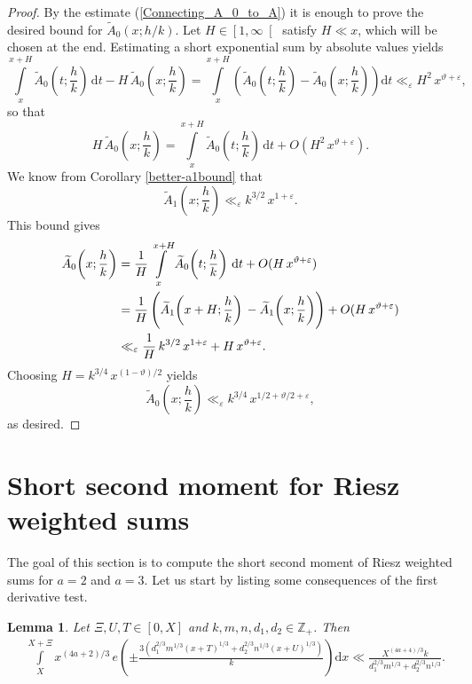 \documentclass[a4paper,10pt,twoside]{amsart}
\newtheorem{lemma}[theorem]{Lemma}
\theoremstyle{definition}
\numberwithin{equation}{section}
\newcommand\eps{\varepsilon}
\renewcommand\:{\colon}
\begin{document}
\begin{proof}
By the estimate (\ref{Connecting_A_0_to_A}) it is enough to prove the desired bound for $\widetilde A_0(x;h/k)$. Let $H\in\left[1,\infty\right[$ satisfy $H\ll x$, which will be chosen at the end. Estimating a short exponential sum by absolute values yields
\[\int\limits_x^{x+H}\widetilde A_0\!\left(t;\frac hk\right)\,\mathrm dt-H\,\widetilde A_0\!\left(x;\frac hk\right)=\int\limits_x^{x+H}\left(\widetilde A_0\!\left(t;\frac hk\right)-\widetilde A_0\!\left(x;\frac hk\right)\right)\mathrm dt\ll_\varepsilon H^2\,x^{\vartheta+\varepsilon},\]
so that
\[H\,\widetilde A_0\!\left(x;\frac hk\right)=\int\limits_x^{x+H}\widetilde A_0\!\left(t;\frac hk\right)\,\mathrm dt+O(H^2\,x^{\vartheta+\varepsilon}).\]
We know from Corollary \ref{better-a1bound} that
\[\widetilde A_1\!\left(x;\frac hk\right)\ll_\eps k^{3/2}\,x^{1+\varepsilon}.\]
This bound gives
\begin{align*}
\widetilde A_0\!\left(x;\frac hk\right)
&=\frac1{H}\int\limits_{x}^{x+H}\widetilde A_0\!\left(t;\frac hk\right)\,\mathrm dt+O(H\,x^{\vartheta+\varepsilon})\\
&=\frac1{H}\left(\widetilde A_1\!\left(x+H;\frac hk\right)\vphantom{\Bigg|}-\widetilde A_1\!\left(x;\frac hk\right)\right)+O(H\,x^{\vartheta+\varepsilon})\\
&\ll_\eps\frac1H\,k^{3/2}\,x^{1+\varepsilon}+H\,x^{\vartheta+\varepsilon}.
\end{align*}
Choosing $H=k^{3/4}\,x^{(1-\vartheta)/2}$ yields
\[\widetilde A_0\!\left(x;\frac hk\right)\ll_\eps k^{3/4}\,x^{1/2+\vartheta/2+\varepsilon},\]
as desired. 
\end{proof}

\section{Short second moment for Riesz weighted sums}

\noindent The goal of this section is to compute the short second moment of Riesz weighted sums for $a=2$ and $a=3$. Let us start by listing some consequences of the first derivative test.

\begin{lemma}\label{first-derivative1}
Let $\Xi,U,T\in\left[0,X\right]$ and $k,m,n,d_1,d_2\in\mathbb Z_+$. Then
\begin{align*}
&\int\limits_X^{X+\Xi}x^{(4a+2)/3}\,e\!\left(\pm\frac{3\!\left(d_1^{2/3}m^{1/3}\left(x+T\right)^{1/3}+d_2^{2/3}n^{1/3}\left(x+U\right)^{1/3}\right)}k\right)\mathrm dx \ll\frac{X^{(4a+4)/3}k}{d_1^{2/3}m^{1/3}+d_2^{2/3}n^{1/3}}.
\end{align*}
\end{lemma}
\end{document}
